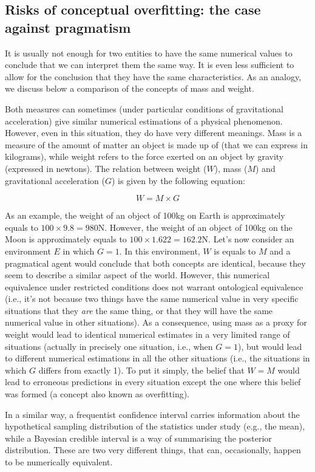 \documentclass[a4paper,man,natbib,floatsintext,donotrepeattitle]{apa6}
\begin{document}
\subsection{Risks of conceptual overfitting: the case against pragmatism}

It is usually not enough for two entities to have the same numerical values to conclude that we can interpret them the same way. It is even less sufficient to allow for the conclusion that they have the same characteristics. As an analogy, we discuss below a comparison of the concepts of mass and weight.

Both measures can sometimes (under particular conditions of gravitational acceleration) give similar numerical estimations of a physical phenomenon. However, even in this situation, they do have very different meanings. Mass is a measure of the amount of matter an object is made up of (that we can express in kilograms), while weight refers to the force exerted on an object by gravity (expressed in newtons). The relation between weight ($W$), mass ($M$) and gravitational acceleration ($G$) is given by the following equation:

$$ W = M \times G $$

As an example, the weight of an object of 100kg on Earth is approximately equals to $100 \times 9.8 = 980 \text{N}$. However, the weight of an object of 100kg on the Moon is approximately equals to $100 \times 1.622 = 162.2\text{N}$. Let's now consider an environment $E$ in which $G = 1$. In this environment, $W$ is equals to $M$ and a pragmatical agent would conclude that both concepts are identical, because they seem to describe a similar aspect of the world. However, this numerical equivalence under restricted conditions does not warrant ontological equivalence (i.e., it's not because two things have the same numerical value in very specific situations that they \textit{are} the same thing, or that they will have the same numerical value in other situations). As a consequence, using mass as a proxy for weight would lead to identical numerical estimates in a very limited range of situations (actually in precisely one situation, i.e., when $G = 1$), but would lead to different numerical estimations in all the other situations (i.e., the situations in which $G$ differs from exactly 1). To put it simply, the belief that $W = M$ would lead to erroneous predictions in every situation except the one where this belief was formed (a concept also known as overfitting).

In a similar way, a frequentist confidence interval carries information about the hypothetical sampling distribution of the statistics under study (e.g., the mean), while a Bayesian credible interval is a way of summarising the posterior distribution. These are two very different things, that can, occasionally, happen to be numerically equivalent.
\end{document}
